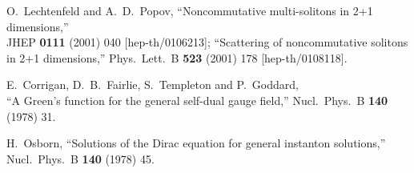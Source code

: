\documentclass[a4paper,11pt]{article}
\numberwithin{equation}{section}
\begin{document}
{\begin{thebibliography}{99}
O.~Lechtenfeld and A.~D.~Popov,
``Noncommutative multi-solitons in 2+1 dimensions,''\\
JHEP {\bf 0111} (2001) 040
[hep-th/0106213];
``Scattering of noncommutative solitons in 2+1 dimensions,''
Phys.\ Lett.\ B {\bf 523} (2001) 178
[hep-th/0108118].

E.~Corrigan, D.~B.~Fairlie, S.~Templeton and P.~Goddard,\\
``A Green's function for the general self-dual gauge field,''
Nucl.\ Phys.\ B {\bf 140} (1978) 31.

H.~Osborn,
``Solutions of the Dirac equation for general instanton solutions,''\\
Nucl.\ Phys.\ B {\bf 140} (1978) 45.
\end{thebibliography} 

}
\end{document}
